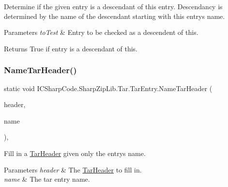 Determine if the given entry is a descendant of this entry. Descendancy is determined by the name of the descendant starting with this entry\textquotesingle{}s name. 


\begin{DoxyParams}{Parameters}
{\em to\+Test} & Entry to be checked as a descendent of this. \\
\hline
\end{DoxyParams}
\begin{DoxyReturn}{Returns}
True if entry is a descendant of this. 
\end{DoxyReturn}
\mbox{\label{class_i_c_sharp_code_1_1_sharp_zip_lib_1_1_tar_1_1_tar_entry_a99c4bbf521a8d7b62d124f428afe7d97}} 
\subsubsection{\texorpdfstring{Name\+Tar\+Header()}{NameTarHeader()}}
{\footnotesize\ttfamily static void I\+C\+Sharp\+Code.\+Sharp\+Zip\+Lib.\+Tar.\+Tar\+Entry.\+Name\+Tar\+Header (\begin{DoxyParamCaption}\item[{\hyperlink{class_i_c_sharp_code_1_1_sharp_zip_lib_1_1_tar_1_1_tar_header}{Tar\+Header}}]{header,  }\item[{string}]{name }\end{DoxyParamCaption})\hspace{0.3cm}{\ttfamily [inline]}, {\ttfamily [static]}}



Fill in a \hyperlink{class_i_c_sharp_code_1_1_sharp_zip_lib_1_1_tar_1_1_tar_header}{Tar\+Header} given only the entry\textquotesingle{}s name. 


\begin{DoxyParams}{Parameters}
{\em header} & The \hyperlink{class_i_c_sharp_code_1_1_sharp_zip_lib_1_1_tar_1_1_tar_header}{Tar\+Header} to fill in. \\
\hline
{\em name} & The tar entry name. \\
\hline
\end{DoxyParams}
\mbox{\label{class_i_c_sharp_code_1_1_sharp_zip_lib_1_1_tar_1_1_tar_entry_a35b323fe98b260560de910f216d9f04c}} 
